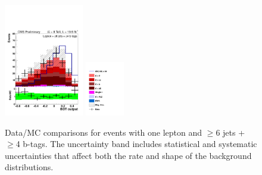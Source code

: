 \begin{figure}[hbtp]
\begin{center}
   \includegraphics[width=0.31\textwidth]{Figures/Analysis_2_Diagrams/LJ_plots_lep/6j4t/lep_disc_ttH_ttbb_best15_8TeV_CFMlpANN_BDT_6j4t_cumulative_wRatio_noLegend_lin.pdf}
   \includegraphics[width=0.15\textwidth]{Figures/Analysis_2_Diagrams/LJ_plots_lep/ttH_legend_1columns.pdf}
   \caption{Data/MC comparisons for events with one lepton and $\ge$6 jets + $\ge$4 b-tags.  The uncertainty band includes statistical and systematic uncertainties that affect both the rate and shape of the background distributions.}
   \label{fig:lj_input_II_6j4t_1}
 \end{center}
\end{figure}			

\clearpage


